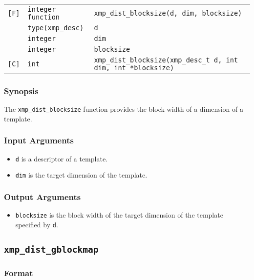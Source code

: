 \begin{tabular}{lll}

\verb![F]!& {\tt integer function}& {\tt xmp\_dist\_blocksize(d, dim, blocksize)}\\
          & {\tt type(xmp\_desc)} & {\tt d}\\
          & {\tt integer} & {\tt dim}\\
          & {\tt integer} & {\tt blocksize}\\

\verb![C]!&  {\tt int}& {\tt xmp\_dist\_blocksize(xmp\_desc\_t d, int dim, int *blocksize)}\\

\end{tabular}

\subsubsection*{Synopsis}

The {\tt xmp\_dist\_blocksize} function provides the block width of
a dimension of a template.


\subsubsection*{Input Arguments}
\begin{itemize}
 \item {\tt d} is a descriptor of a template.
        \item {\tt dim} is the target dimension of the template.
\end{itemize}

\subsubsection*{Output Arguments}
\begin{itemize}
 \item {\tt blocksize} is the block width of the target dimension of
       the template specified by {\tt d}.
\end{itemize}


\subsection{\tt xmp\_dist\_gblockmap}

\subsubsection*{Format}

